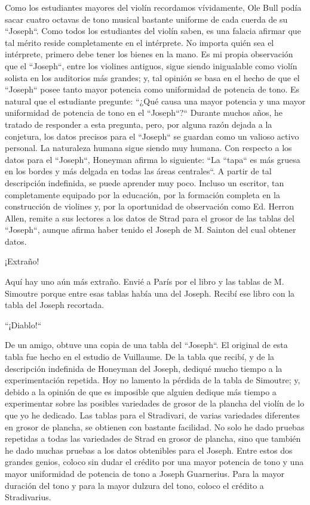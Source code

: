\documentclass[12pt]{book}
\begin{document}
Como los estudiantes mayores del violín recordamos vívidamente, Ole Bull podía sacar cuatro octavas de tono musical bastante uniforme de cada cuerda de su ``Joseph``. Como todos los estudiantes del violín saben, es una falacia afirmar que tal mérito reside completamente en el intérprete. No importa quién sea el intérprete, primero debe tener los bienes en la mano. Es mi propia observación que el ``Joseph``, entre los violines antiguos, sigue siendo inigualable como violín solista en los auditorios más grandes; y, tal opinión se basa en el hecho de que el ``Joseph`` posee tanto mayor potencia como uniformidad de potencia de tono. Es natural que el estudiante pregunte: ``¿Qué causa una mayor potencia y una mayor uniformidad de potencia de tono en el ``Joseph``?`` Durante muchos años, he tratado de responder a esta pregunta, pero, por alguna razón dejada a la conjetura, los datos precisos para el ``Joseph`` se guardan como un valioso activo personal. La naturaleza humana sigue siendo muy humana. Con respecto a los datos para el ``Joseph``, Honeyman afirma lo siguiente: ``La ``tapa`` es más gruesa en los bordes y más delgada en todas las áreas centrales``. A partir de tal descripción indefinida, se puede aprender muy poco. Incluso un escritor, tan completamente equipado por la educación, por la formación completa en la construcción de violines y, por la oportunidad de observación como Ed. Herron Allen, remite a sus lectores a los datos de Strad para el grosor de las tablas del ``Joseph``, aunque afirma haber tenido el Joseph de M. Sainton del cual obtener datos.

¡Extraño!

Aquí hay uno aún más extraño. Envié a París por el libro y las tablas de M. Simoutre porque entre esas tablas había una del Joseph. Recibí ese libro con la tabla del Joseph recortada.

``¡Diablo!``

De un amigo, obtuve una copia de una tabla del ``Joseph``. El original de esta tabla fue hecho en el estudio de Vuillaume. De la tabla que recibí, y de la descripción indefinida de Honeyman del Joseph, dediqué mucho tiempo a la experimentación repetida. Hoy no lamento la pérdida de la tabla de Simoutre; y, debido a la opinión de que es imposible que alguien dedique más tiempo a experimentar sobre las posibles variedades de grosor de la plancha del violín de lo que yo he dedicado. Las tablas para el Stradivari, de varias variedades diferentes en grosor de plancha, se obtienen con bastante facilidad. No solo he dado pruebas repetidas a todas las variedades de Strad en grosor de plancha, sino que también he dado muchas pruebas a los datos obtenibles para el Joseph. Entre estos dos grandes genios, coloco sin dudar el crédito por una mayor potencia de tono y una mayor uniformidad de potencia de tono a Joseph Guarnerius. Para la mayor duración del tono y para la mayor dulzura del tono, coloco el crédito a Stradivarius.
\end{document}
